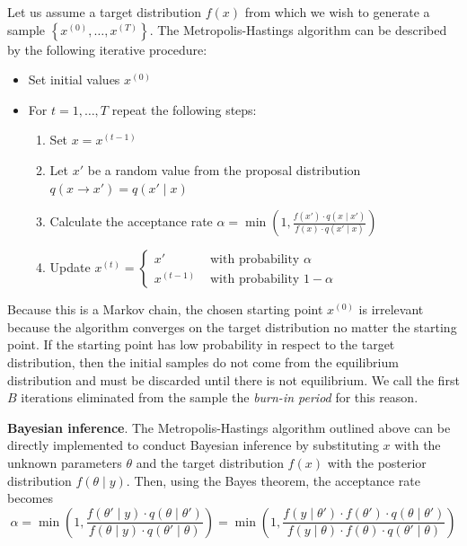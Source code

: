 \documentclass[11pt,fleqn]{book} %
\begin{document}
\begin{algorithm}
	Let us assume a target distribution $f(x)$ from which we wish to 
	generate a sample $\left\{x^{(0)},\dots,x^{(T)}\right\}$. The 
	Metropolis-Hastings algorithm can be described by the following 
	iterative procedure:
	\begin{itemize}
		\item Set initial values $x^{(0)}$
		\item For $t=1,\dots,T$ repeat the following steps:
		\begin{enumerate}
			\item Set $x=x^{(t-1)}$
			\item Let $x'$ be a random value from the proposal distribution 
			$q(x \to x')=q(x' \mid x)$
			\item Calculate the acceptance rate 
			$\alpha = \min\left(1,\frac{f(x') \cdot q(x \mid x')}{f(x) \cdot q(x' \mid x)}\right)$
			\item Update $x^{(t)}=\left\{
			\begin{array}{ll}
				x'        & \text{ with probability } \alpha   \\
				x^{(t-1)} & \text{ with probability } 1-\alpha 
			\end{array}\right.$ 
		\end{enumerate}
	\end{itemize}
\end{algorithm}

Because this is a Markov chain, the chosen starting point $x^{(0)}$ is 
irrelevant because the algorithm converges on the target distribution
no matter the starting point. If the starting point has low probability 
in respect to the target distribution, then the initial samples do not 
come from the equilibrium distribution and must be discarded until there 
is not equilibrium. We call the first $B$ iterations eliminated from the 
sample the \emph{burn-in period} for this reason.

\textbf{Bayesian inference}.
The Metropolis-Hastings algorithm outlined above can be directly implemented 
to conduct Bayesian inference by substituting $x$ with the unknown parameters 
$\theta$ and the target distribution $f(x)$ with the posterior distribution 
$f(\theta \mid y)$. Then, using the Bayes theorem, the acceptance rate 
becomes
\begin{displaymath}
	\alpha = \min\left(1,\frac{f(\theta' \mid y) \cdot q(\theta \mid \theta')}{f(\theta \mid y) \cdot q(\theta' \mid \theta)}\right) = \min\left(1,\frac{f(y \mid \theta') \cdot f(\theta') \cdot q(\theta \mid \theta')}{f(y \mid \theta)  \cdot f(\theta) \cdot q(\theta' \mid \theta)}\right)
\end{displaymath}
\end{document}

